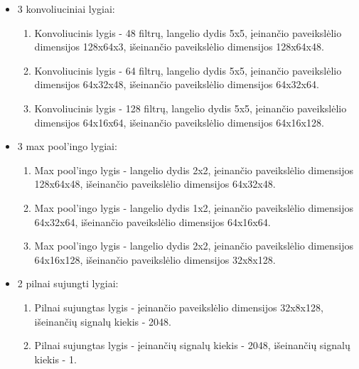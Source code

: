 \documentclass{VUMIFInfBakalaurinis}
\begin{document}
\begin{itemize}[itemsep=0.5pt]
  \item 3 konvoliuciniai lygiai:
    \begin{enumerate}[itemsep=0.5pt]
      \item Konvoliucinis lygis - 48 filtrų, langelio dydis 5x5, įeinančio paveikslėlio dimensijos 128x64x3, išeinančio paveikslėlio dimensijos 128x64x48.
      \item Konvoliucinis lygis - 64 filtrų, langelio dydis 5x5, įeinančio paveikslėlio dimensijos 64x32x48, išeinančio paveikslėlio dimensijos 64x32x64.
      \item Konvoliucinis lygis - 128 filtrų, langelio dydis 5x5, įeinančio paveikslėlio dimensijos 64x16x64, išeinančio paveikslėlio dimensijos 64x16x128.
    \end{enumerate}
  \item 3 max pool'ingo lygiai:
    \begin{enumerate}[itemsep=0.5pt]
      \item Max pool'ingo lygis - langelio dydis 2x2, įeinančio paveikslėlio dimensijos 128x64x48, išeinančio paveikslėlio dimensijos 64x32x48.
      \item Max pool'ingo lygis - langelio dydis 1x2, įeinančio paveikslėlio dimensijos 64x32x64, išeinančio paveikslėlio dimensijos 64x16x64.
      \item Max pool'ingo lygis - langelio dydis 2x2, įeinančio paveikslėlio dimensijos 64x16x128, išeinančio paveikslėlio dimensijos 32x8x128.
    \end{enumerate}
  \item 2 pilnai sujungti lygiai:
    \begin{enumerate}[itemsep=0.5pt]
      \item Pilnai sujungtas lygis - įeinančio paveikslėlio dimensijos 32x8x128, išeinančių signalų kiekis - 2048.
      \item Pilnai sujungtas lygis - įeinančių signalų kiekis - 2048, išeinančių signalų kiekis - 1.
    \end{enumerate}
\end{itemize}
\end{document}
